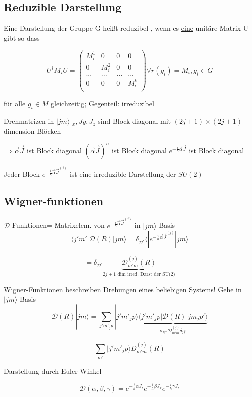 \subsection{Reduzible Darstellung}

Eine Darstellung der Gruppe G heißt reduzibel , wenn es \underline{eine} unitäre
Matrix U gibt so dass

\[ U^\dagger M_iU = \left(\begin{array}{cccc}
M_i^{1}&0&0&0 \\
0&M_i^{2}&0&0 \\
...&...&...&...\\
0&0&0&M_i^{k} \\
\end{array}\right) \forall r(g_i)=M_i, g_i\in G\]

für alle \(g_i\in M\) gleichzeitig; Gegenteil: irreduzibel

Drehmatrizen in \(|jm\rangle\) \(_x,Jy,J_z\) sind Block diagonal mit \((2j+1)\times(2j+1)\)
dimension Blöcken

\(\Rightarrow \vec\alpha\vec J \) ist Block diagonal
\((\vec\alpha\vec J)^n\) ist Block diagonal
\(e^{-\frac i \hbar \vec \alpha \vec J}\) ist Block diagonal

Jeder Block \(e^{-\frac i \hbar \vec \alpha \vec J^{(j)}}\) ist eine irreduzible
Darstellung der \(SU(2)\)


\subsection{Wigner-funktionen}

\(\mathcal D\)-Funktionen= Matrixelem. von  \(e^{-\frac i \hbar \vec \alpha \vec J^{(j)}}\) in \(|jm\rangle\) Basis
\[ \langle j'm'|\mathcal D(R)| jm\rangle= \delta_{jj'} \langle |e^{-\frac i \hbar \vec \alpha  \vec J^{(j)}} |jm\rangle\]

\[=\delta_{jj'} \underbrace{\mathcal D^{(j)}_{m'm}(R)}_{2j+1 \text{ dim irred.
    Darst der SU(2)}}\]


Wigner-Funktionen beschreiben Drehungen eines beliebigen Systems! Gehe in
\(|jm\rangle\) Basis
\[\mathcal D(R)|jm\rangle=\sum_{j'm'_jp}|j'm'_jp\rangle\underbrace{\langle
  j'm'_jp|\mathcal D(R)|jm_jp'\rangle}_{\sigma_{pp'}\mathcal
  D^{(j)}_{m'm}\delta_{jj'}}\]

\[ \sum_{m'}|j'm'_jp\rangle D^{(j)}_{m'm}(R) \]

Darstellung durch Euler Winkel

\[ \mathcal D(\alpha,\beta,\gamma)=e^{-\frac i \hbar \alpha J_z} e^{-\frac i \hbar \beta J_x}e^{-\frac i \hbar \gamma J_z}\]

